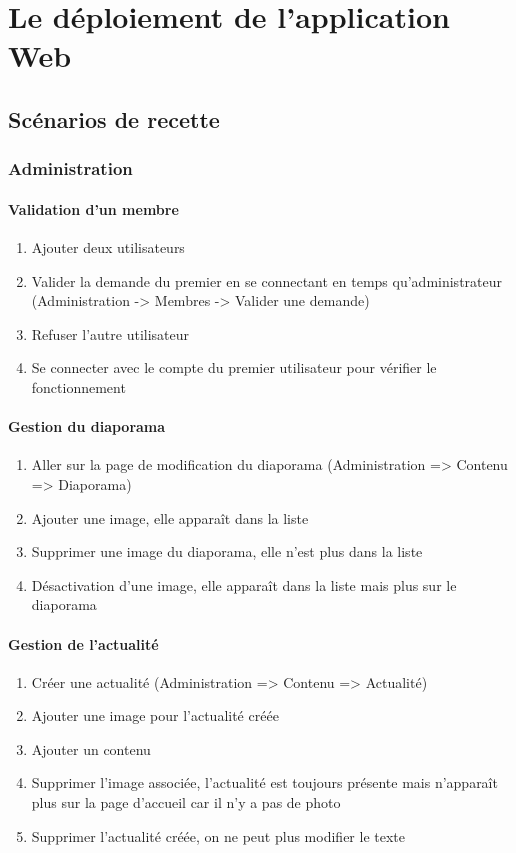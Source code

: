 \documentclass[11pt]{report}
\begin{document}
\chapter{Le déploiement de l'application Web}
\section{Scénarios de recette}
\subsection{Administration}
\subsubsection*{Validation d'un membre}
\begin{enumerate}
\item Ajouter deux utilisateurs
\item Valider la demande du premier en se connectant en temps qu'administrateur (Administration -> Membres -> Valider une demande)
\item Refuser l’autre utilisateur
\item Se connecter avec le compte du premier utilisateur pour vérifier le fonctionnement
\end{enumerate}
\subsubsection*{Gestion du diaporama}
\begin{enumerate}
\item Aller sur la page de modification du diaporama (Administration => Contenu => Diaporama)
\item Ajouter une image, elle apparaît dans la liste
\item Supprimer une image du diaporama, elle n'est plus dans la liste
\item Désactivation d’une image, elle apparaît dans la liste mais plus sur le 
diaporama
\end{enumerate}
\subsubsection*{Gestion de l'actualité}
\begin{enumerate}
\item Créer une actualité (Administration => Contenu => Actualité)
\item Ajouter une image pour l’actualité créée
\item Ajouter un contenu
\item Supprimer l’image associée, l'actualité est toujours présente mais 
n’apparaît plus sur la page d'accueil car il n'y a pas de photo
\item Supprimer l’actualité créée, on ne peut plus modifier le texte
\end{enumerate}
\end{document}
